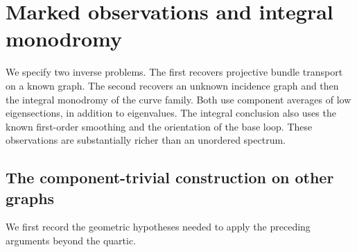 \section{Marked observations and integral monodromy}\label{sec:inverse}

We specify two inverse problems. The first recovers
projective bundle transport on a known graph.
The second recovers an unknown incidence graph and
then the integral monodromy of the curve family.
Both use component averages of low eigensections,
in addition to eigenvalues. The integral conclusion
also uses the known first-order smoothing and the
orientation of the base loop. These observations
are substantially richer than an unordered spectrum.

\subsection{The component-trivial construction on other graphs}
We first record the geometric hypotheses needed
to apply the preceding arguments beyond the quartic.

